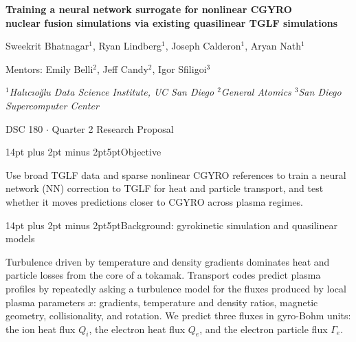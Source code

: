 \documentclass[10pt,letterpaper]{article}
\makeatletter
\renewcommand{\section}{\@startsection{section}{1}{0pt}
 {14pt plus 2pt minus 2pt}{5pt}{\normalfont\large\bfseries}}
\makeatother
\begin{document}
{\centering\setlength{\parskip}{0pt}
      {\fontsize{14}{17}\selectfont\bfseries
            Training a neural network surrogate for nonlinear CGYRO\\
            nuclear fusion simulations via existing quasilinear TGLF simulations\par}
      \vspace{8pt}
      Sweekrit Bhatnagar$^{1}$, Ryan Lindberg$^{1}$, Joseph Calderon$^{1}$, Aryan Nath$^{1}$\par
      \vspace{2pt}
      Mentors: Emily Belli$^{2}$, Jeff Candy$^{2}$, Igor Sfiligoi$^{3}$\par
      \vspace{4pt}
      {\small\itshape
            $^{1}$Hal\i c\i o\u{g}lu Data Science Institute, UC San Diego \enspace
            $^{2}$General Atomics \enspace
            $^{3}$San Diego Supercomputer Center\par}
      \vspace{6pt}
      DSC 180 \enspace $\cdot$ \enspace Quarter 2 Research Proposal\par
}
\vspace{2pt}

\section{Objective}

Use broad TGLF data and sparse nonlinear CGYRO references to train a neural network (NN) correction to TGLF for heat and particle transport, and test whether it moves predictions closer to CGYRO across plasma regimes.

\section{Background: gyrokinetic simulation and quasilinear models}
\label{sec:background}

Turbulence driven by temperature and density gradients dominates heat and particle losses from the core of a tokamak. Transport codes predict plasma profiles by repeatedly asking a turbulence model for the fluxes produced by local plasma parameters $x$: gradients, temperature and density ratios, magnetic geometry, collisionality, and rotation. We predict three fluxes in gyro-Bohm units: the ion heat flux $Q_i$, the electron heat flux $Q_e$, and the electron particle flux $\Gamma_e$.
\end{document}
